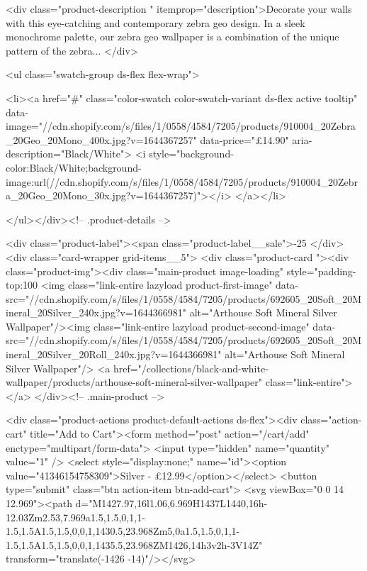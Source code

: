 {{{{{{{<div class="product-description " itemprop="description">Decorate your walls with this eye-catching and contemporary zebra geo design. In a sleek monochrome palette, our zebra geo wallpaper is a combination of the unique pattern of the zebra...
</div>



<ul class="swatch-group ds-flex flex-wrap">
        
<li><a href="#" class="color-swatch color-swatch-variant ds-flex active tooltip" data-image="//cdn.shopify.com/s/files/1/0558/4584/7205/products/910004_20Zebra_20Geo_20Mono_400x.jpg?v=1644367257" data-price="£14.90" aria-description="Black/White">
              <i style="background-color:Black/White;background-image:url(//cdn.shopify.com/s/files/1/0558/4584/7205/products/910004_20Zebra_20Geo_20Mono_30x.jpg?v=1644367257)"></i>
            </a></li>

      </ul></div><!-- .product-details -->

<div class="product-label"><span class="product-label__sale">-25%
          </div><div class="card-wrapper grid-items__5">
            <div class="product-card "><div class="product-img"><div class="main-product image-loading" style="padding-top:100%
      <img class="link-entire lazyload product-first-image" data-src="//cdn.shopify.com/s/files/1/0558/4584/7205/products/692605_20Soft_20Mineral_20Silver_240x.jpg?v=1644366981" alt="Arthouse Soft Mineral Silver Wallpaper"/><img class="link-entire lazyload product-second-image" data-src="//cdn.shopify.com/s/files/1/0558/4584/7205/products/692605_20Soft_20Mineral_20Silver_20Roll_240x.jpg?v=1644366981" alt="Arthouse Soft Mineral Silver Wallpaper"/>
      <a href="/collections/black-and-white-wallpaper/products/arthouse-soft-mineral-silver-wallpaper" class="link-entire"></a>
    </div><!-- .main-product -->
  
<div class="product-actions product-default-actions ds-flex"><div class="action-cart" title="Add to Cart"><form method="post" action="/cart/add" enctype="multipart/form-data">
            <input type="hidden" name="quantity" value="1" />
            <select style="display:none;" name="id"><option value="41346154758309">Silver - £12.99</option></select>
            <button type="submit" class="btn action-item btn-add-cart">
              <svg viewBox="0 0 14 12.969"><path d="M1427.97,16l1.06,6.969H1437L1440,16h-12.03Zm2.53,7.969a1.5,1.5,0,1,1-1.5,1.5A1.5,1.5,0,0,1,1430.5,23.968Zm5,0a1.5,1.5,0,1,1-1.5,1.5A1.5,1.5,0,0,1,1435.5,23.968ZM1426,14h3v2h-3V14Z" transform="translate(-1426 -14)"/></svg>

}}}}}}}
